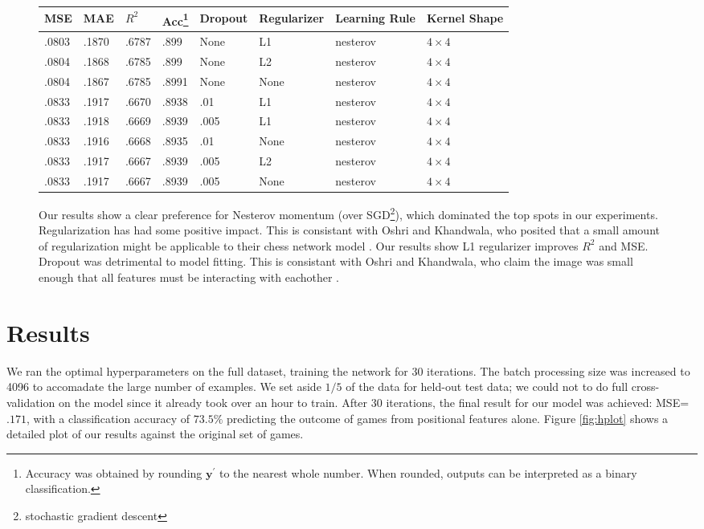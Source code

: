 \documentclass{article}
\begin{document}
\begin{figure}[ht]
\centering
\begin{tabular}{|l|l|l|l|l|l|l|l|}
\hline
\textbf{MSE} & \textbf{MAE} & \textbf{$R^2$} & \textbf{Acc\footnote{Accuracy was obtained by rounding $\textbf{y}^\prime$ to the nearest whole number.  When rounded, outputs can be interpreted as a binary classification.}} & \textbf{Dropout} & \textbf{Regularizer} & \textbf{Learning Rule} & \textbf{Kernel Shape} \\
\hline
.0803 & .1870 & .6787 & .899 & None & L1 & nesterov & $4\times 4$ \\
.0804 & .1868 & .6785 & .899 & None & L2 & nesterov & $4\times 4$ \\
.0804 & .1867 & .6785 & .8991 & None & None & nesterov & $4\times 4$ \\
.0833 & .1917 & .6670 & .8938 & .01 & L1 & nesterov & $4\times 4$ \\
.0833 & .1918 & .6669 & .8939 & .005 & L1 & nesterov & $4\times 4$ \\
.0833 & .1916 & .6668 & .8935 & .01 & None & nesterov & $4\times 4$ \\
.0833 & .1917 & .6667 & .8939 & .005 & L2 & nesterov & $4\times 4$ \\
.0833 & .1917 & .6667 & .8939 & .005 & None & nesterov & $4\times 4$ \\
\hline
\end{tabular}
\caption{Our results show a clear preference for Nesterov momentum (over SGD\footnote{stochastic gradient descent}), which dominated the top spots in our experiments.  Regularization has had some positive impact.  This is consistant with Oshri and Khandwala, who posited that a small amount of regularization might be applicable to their chess network model \cite{Oshri_Khandwala}. Our results show L1 regularizer improves $R^2$ and MSE.  Dropout was detrimental to model fitting.  This is consistant with Oshri and Khandwala, who claim the image was small enough that all features must be interacting with eachother \cite{Oshri_Khandwala}. \label{fig:paramtable}}
\end{figure}

\section{Results}

We ran the optimal hyperparameters on the full dataset, training the network for 30 iterations.  The batch processing size was increased to 4096 to accomadate the large number of examples.  We set aside $1/5$ of the data for held-out test data; we could not to do full cross-validation on the model since it already took over an hour to train.  After 30 iterations, the final result for our model was achieved: MSE=$.171$, with a classification accuracy of $73.5\%$ predicting the outcome of games from positional features alone.  Figure \ref{fig:hplot} shows a detailed plot of our results against the original set of games.
\end{document}
